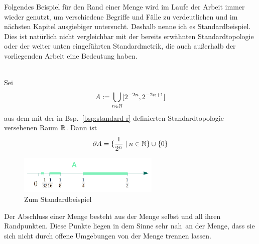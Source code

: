     
    Folgendes
    Beispiel für den Rand einer Menge wird im Laufe der Arbeit immer wieder genutzt, um verschiedene Begriffe und Fälle zu verdeutlichen und 
    im nächsten Kapitel ausgiebiger untersucht.
    Deshalb nenne ich es Standardbeispiel.
    Dies ist natürlich nicht vergleichbar mit der bereits erwähnten Standardtopologie oder der weiter unten eingeführten Standardmetrik, die auch außerhalb der vorliegenden Arbeit eine Bedeutung haben.
    
    \begin{bsp}[Standardbeispiel]\label{bsp:standardbsp}\ \\
        Sei $$A := \bigcup_{n \in \mathbb{N}} [2^{-2n}, 2^{-2n+1}]$$ aus dem mit der in Bsp.\ \ref{bsp:standard-r} definierten Standardtopologie versehenen Raum $\mathbb{R}$.
        Dann ist
        \begin{align*}
            \partial A = \{\frac{1}{2^n} \mid n \in \mathbb{N}\} \cup \{0\}
        \end{align*}
    \end{bsp}
    
    \begin{figure}[ht]
        \centering
        \includegraphics[width=0.6\textwidth]{gfx/standardbsp.png}
        \caption{Zum Standardbeispiel}
        \label{fig:standardbsp}
    \end{figure}
    
    
    Der
    Abschluss einer Menge besteht aus der Menge selbst und all ihren Randpunkten. Diese Punkte liegen in dem Sinne \glqq sehr nah\grqq\ an der Menge, dass sie sich nicht durch offene Umgebungen von der Menge trennen lassen.
    
